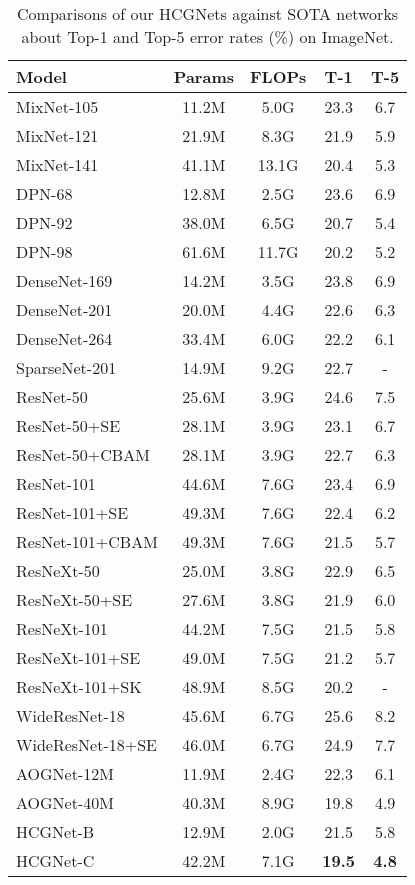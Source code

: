 \documentclass[letterpaper]{article}
\begin{document}
\begin{table}[tbp]
	\centering
	\caption{Comparisons of our HCGNets against SOTA networks about Top-1 and Top-5 error rates (\%) on ImageNet.}
	\label{imagenet}  
	\begin{tabular}{lcccc}  
		\toprule
		Model&Params&FLOPs&T-1&T-5 \\  
		\midrule
		MixNet-105&11.2M&5.0G&23.3&6.7\\
		MixNet-121&21.9M&8.3G&21.9&5.9\\
		MixNet-141&41.1M&13.1G&20.4&5.3\\	 
		\midrule
		DPN-68 &12.8M&2.5G&23.6&6.9 \\
		DPN-92 &38.0M&6.5G&20.7&5.4 \\
		DPN-98 &61.6M&11.7G&20.2&5.2 \\
		\midrule
		DenseNet-169 &14.2M&3.5G&23.8&6.9 \\
		DenseNet-201 &20.0M&4.4G&22.6&6.3 \\
		DenseNet-264 &33.4M&6.0G&22.2&6.1 \\
		\midrule
		SparseNet-201 &14.9M&9.2G&22.7&- \\
		\midrule
		ResNet-50&25.6M&3.9G&24.6&7.5 \\
		ResNet-50+SE&28.1M&3.9G&23.1&6.7 \\
		ResNet-50+CBAM&28.1M&3.9G&22.7&6.3 \\
		ResNet-101&44.6M&7.6G&23.4&6.9 \\
		ResNet-101+SE&49.3M&7.6G&22.4&6.2 \\
		ResNet-101+CBAM&49.3M&7.6G&21.5&5.7 \\
		\midrule
		ResNeXt-50&25.0M&3.8G&22.9&6.5 \\
		ResNeXt-50+SE&27.6M&3.8G&21.9&6.0 \\
		ResNeXt-101&44.2M&7.5G&21.5&5.8 \\
		ResNeXt-101+SE&49.0M&7.5G&21.2&5.7 \\
		ResNeXt-101+SK&48.9M&8.5G&20.2&- \\
		\midrule
		WideResNet-18&45.6M&6.7G&25.6&8.2 \\
		WideResNet-18+SE&46.0M&6.7G&24.9&7.7 \\
		\midrule
		AOGNet-12M&11.9M&2.4G&22.3&6.1 \\
		AOGNet-40M&40.3M&8.9G&19.8&4.9 \\
		\midrule
		HCGNet-B&12.9M&2.0G&21.5&5.8 \\
		HCGNet-C&42.2M&7.1G&\textbf{19.5}&\textbf{4.8} \\
		\bottomrule
	\end{tabular}
\end{table}
\end{document}

